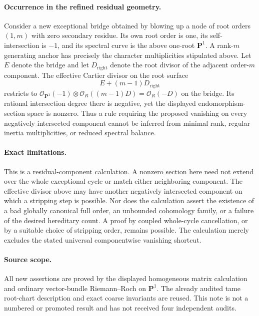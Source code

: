 \paragraph{Occurrence in the refined residual geometry.}
Consider a new exceptional bridge obtained by blowing up a node of root
orders $(1,m)$ with zero secondary residue. Its own root order is one,
its self-intersection is $-1$, and its spectral curve is the above
one-root $\mathbf P^1$. A rank-$m$ generating anchor has precisely the
character multiplicities stipulated above. Let $E$ denote the bridge and
let $D_{\mathrm{right}}$ denote the root divisor of the adjacent
order-$m$ component. The effective Cartier divisor on the root surface
\[
                         E+(m-1)D_{\mathrm{right}}
\]
restricts to
$\mathcal O_{\mathbf P^1}(-1)\otimes\mathcal O_R((m-1)D)
=\mathcal O_R(-D)$ on the bridge. Its rational intersection degree there
is negative, yet the displayed endomorphism-section space is nonzero.
Thus a rule requiring the proposed vanishing on every negatively
intersected component cannot be inferred from minimal rank, regular
inertia multiplicities, or reduced spectral balance.

\paragraph{Exact limitations.}
This is a residual-component calculation. A nonzero section here need
not extend over the whole exceptional cycle or match either neighboring
component. The effective divisor above may have another negatively
intersected component on which a stripping step is possible. Nor does the
calculation assert the existence of a bad globally canonical full order,
an unbounded cohomology family, or a failure of the desired hereditary
count. A proof by coupled whole-cycle cancellation, or by a suitable
choice of stripping order, remains possible. The calculation merely
excludes the stated universal componentwise vanishing shortcut.

\paragraph{Source scope.}
All new assertions are proved by the displayed homogeneous matrix
calculation and ordinary vector-bundle Riemann--Roch on $\mathbf P^1$.
The already audited tame root-chart description and exact coarse
invariants are reused. This note is not a numbered or promoted result
and has not received four independent audits.
